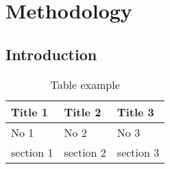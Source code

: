  \chapter{Methodology}\label{ch:methodology}

\section{Introduction}\label{sec:intro}


\begin{table}[H]
	\centering
	\begin{tabular}{|l|l|l|}
		\hline
		Title 1   & Title 2   & Title 3   \\ \hline
		No 1      & No 2      & No 3      \\ \hline
		section 1 & section 2 & section 3 \\ \hline
	\end{tabular}
	\caption{Table example}
	\label{tableex}
\end{table}

